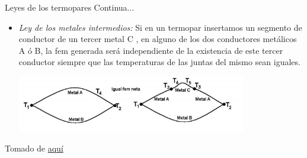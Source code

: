 \documentclass[aspectratio=169]{beamer}
\begin{document}
\begin{frame}{Leyes de los termopares}
    Continua...\\[8pt]
    \begin{itemize}
        \item \emph{Ley de los metales intermedios: } Si en un termopar insertamos un segmento de conductor de un tercer metal C , en alguno de los dos conductores metálicos A ó B, la fem generada será independiente de la existencia de este tercer conductor siempre que las temperaturas de las juntas del mismo sean iguales. 
        \begin{center}
            \includegraphics[width=10cm]{fig/ley3.PNG}
        \end{center}
    \end{itemize}
    \tiny{Tomado de \href{http://laboratorios.fi.uba.ar/lscm/termocuplas01.pdf}{aquí}}
\end{frame}

\end{document}
